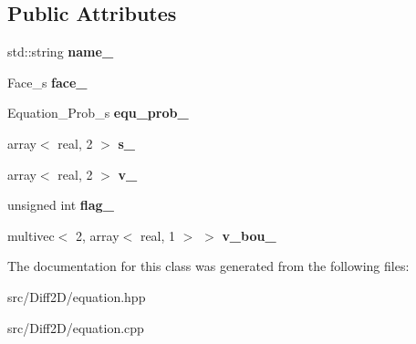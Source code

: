\subsection*{Public Attributes}
\begin{DoxyCompactItemize}
\item 
\hypertarget{classEquation_a2bbb65c98ebf1345231370e93b504037}{
std::string {\bfseries name\_\-}}
\label{classEquation_a2bbb65c98ebf1345231370e93b504037}

\item 
\hypertarget{classEquation_a9eeeceed0d8130fd30fb2e65f3b15f3f}{
Face\_\-s {\bfseries face\_\-}}
\label{classEquation_a9eeeceed0d8130fd30fb2e65f3b15f3f}

\item 
\hypertarget{classEquation_a1ece93bf1c58eb22001327da69ab73fc}{
Equation\_\-Prob\_\-s {\bfseries equ\_\-prob\_\-}}
\label{classEquation_a1ece93bf1c58eb22001327da69ab73fc}

\item 
\hypertarget{classEquation_ac7f793f3b1e3694b719d91d884460880}{
array$<$ real, 2 $>$ {\bfseries s\_\-}}
\label{classEquation_ac7f793f3b1e3694b719d91d884460880}

\item 
\hypertarget{classEquation_aa48c28c116aec278f7713a414dec6196}{
array$<$ real, 2 $>$ {\bfseries v\_\-}}
\label{classEquation_aa48c28c116aec278f7713a414dec6196}

\item 
\hypertarget{classEquation_a1820f1ab792e83981456fce5dda492b9}{
unsigned int {\bfseries flag\_\-}}
\label{classEquation_a1820f1ab792e83981456fce5dda492b9}

\item 
\hypertarget{classEquation_ab4039b291316d3a42c43330e868b4f50}{
multivec$<$ 2, array$<$ real, 1 $>$ $>$ {\bfseries v\_\-bou\_\-}}
\label{classEquation_ab4039b291316d3a42c43330e868b4f50}

\end{DoxyCompactItemize}


The documentation for this class was generated from the following files:\begin{DoxyCompactItemize}
\item 
src/Diff2D/equation.hpp\item 
src/Diff2D/equation.cpp\end{DoxyCompactItemize}

